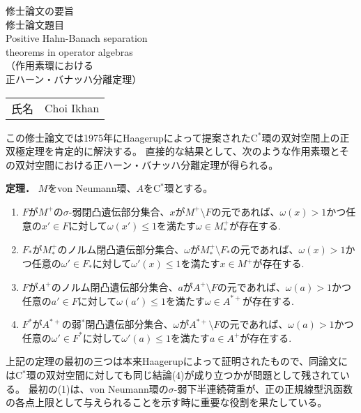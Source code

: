 \documentclass[noamsfonts,a4paper,10pt]{amsart}
\theoremstyle{plain}
\theoremstyle{definition}
\theoremstyle{remark}
\begin{document}
\fi







\newpage
\thispagestyle{empty}

\begin{center}
{\huge 修士論文の要旨}\\[36pt]
{\Huge 修士論文題目}\\[24pt]
{\Huge Positive Hahn-Banach separation\\[8pt]
theorems in operator algebras}\\[24pt]
{\huge （作用素環における\\[8pt]
正ハーン・バナッハ分離定理）}\\[36pt]
\begin{tabular}{cl}
{\LARGE 氏名} & {\LARGE Choi Ikhan}\\[36pt]
\end{tabular}
\end{center}



この修士論文では1975年にHaagerupによって提案されたC$^*$環の双対空間上の正双極定理を肯定的に解決する。
直接的な結果として、次のような作用素環とその双対空間における正ハーン・バナッハ分離定理が得られる。

\textbf{定理．}
$M$をvon Neumann環、$A$をC$^*$環とする。
\begin{enumerate}
\item $F$が$M^+$の$\sigma$-弱閉凸遺伝部分集合、$x$が$M^+\setminus F$の元であれば、$\omega(x)>1$\quad かつ任意の$x'\in F$に対して$\omega(x')\le1$を満たす$\omega\in M_*^+$が存在する.
\item $F_*$が$M_*^+$のノルム閉凸遺伝部分集合、$\omega$が$M_*^+\setminus F_*$の元であれば、$\omega(x)>1$\quad かつ任意の$\omega'\in F_*$に対して$\omega'(x)\le1$を満たす$x\in M^+$が存在する.
\item $F$が$A^+$のノルム閉凸遺伝部分集合、$a$が$A^+\setminus F$の元であれば、$\omega(a)>1$\quad かつ任意の$a'\in F$に対して$\omega(a')\le1$を満たす$\omega\in A^{*+}$が存在する.
\item $F^*$が$A^{*+}$の弱$^*$閉凸遺伝部分集合、$\omega$が$A^{*+}\setminus F$の元であれば、$\omega(a)>1$\quad かつ任意の$\omega'\in F^*$に対して$\omega'(a)\le1$を満たす$a\in A^+$が存在する.
\end{enumerate}

上記の定理の最初の三つは本来Haagerupによって証明されたもので、同論文にはC$^*$環の双対空間に対しても同じ結論(4)が成り立つかが問題として残されている。
最初の(1)は、von Neumann環の$\sigma$-弱下半連続荷重が、正の正規線型汎函数の各点上限として与えられることを示す時に重要な役割を果たしている。
\end{document}
